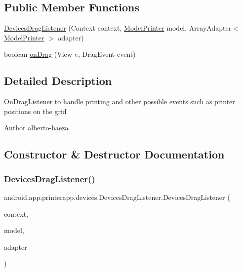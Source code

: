 \subsection*{Public Member Functions}
\begin{DoxyCompactItemize}
\item 
\hyperlink{classandroid_1_1app_1_1printerapp_1_1devices_1_1_devices_drag_listener_aa95569a24c0afaf41d0f3db1d1e87726}{Devices\+Drag\+Listener} (Context context, \hyperlink{classandroid_1_1app_1_1printerapp_1_1model_1_1_model_printer}{Model\+Printer} model, Array\+Adapter$<$ \hyperlink{classandroid_1_1app_1_1printerapp_1_1model_1_1_model_printer}{Model\+Printer} $>$ adapter)
\item 
boolean \hyperlink{classandroid_1_1app_1_1printerapp_1_1devices_1_1_devices_drag_listener_a8a7274ff7b0bd924b5f96e9da841c4ce}{on\+Drag} (View v, Drag\+Event event)
\end{DoxyCompactItemize}


\subsection{Detailed Description}
On\+Drag\+Listener to handle printing and other possible events such as printer positions on the grid \begin{DoxyAuthor}{Author}
alberto-\/baeza 
\end{DoxyAuthor}


\subsection{Constructor \& Destructor Documentation}
\mbox{\label{classandroid_1_1app_1_1printerapp_1_1devices_1_1_devices_drag_listener_aa95569a24c0afaf41d0f3db1d1e87726}} 
\subsubsection{\texorpdfstring{Devices\+Drag\+Listener()}{DevicesDragListener()}}
{\footnotesize\ttfamily android.\+app.\+printerapp.\+devices.\+Devices\+Drag\+Listener.\+Devices\+Drag\+Listener (\begin{DoxyParamCaption}\item[{Context}]{context,  }\item[{\hyperlink{classandroid_1_1app_1_1printerapp_1_1model_1_1_model_printer}{Model\+Printer}}]{model,  }\item[{Array\+Adapter$<$ \hyperlink{classandroid_1_1app_1_1printerapp_1_1model_1_1_model_printer}{Model\+Printer} $>$}]{adapter }\end{DoxyParamCaption})}

